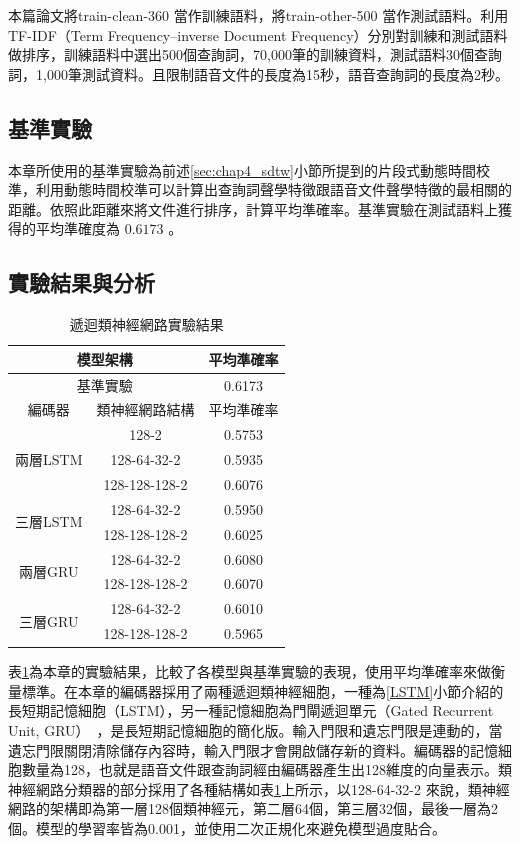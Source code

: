  本篇論文將train-clean-360 當作訓練語料，將train-other-500
 當作測試語料。利用TF-IDF（Term Frequency–inverse Document
 Frequency）分別對訓練和測試語料做排序，訓練語料中選出500個查詢詞，70,000筆的訓練資料，測試語料30個查詢詞，1,000筆測試資料。且限制語音文件的長度為15秒，語音查詢詞的長度為2秒。
\subsection{基準實驗}
本章所使用的基準實驗為前述\ref{sec:chap4_sdtw}小節所提到的片段式動態時間校準，利用動態時間校準可以計算出查詢詞聲學特徵跟語音文件聲學特徵的最相關的距離。依照此距離來將文件進行排序，計算平均準確率。基準實驗在測試語料上獲得的平均準確度為 $ 0.6173 $ 。
\subsection{實驗結果與分析}
 \begin{table}[ht]
	 \centering
	 \caption{遞迴類神經網路實驗結果}

	 \label{table:ch3_exp}
	 \begin{tabular}{|c|c|c|}
		 \hline
		 \multicolumn{2}{|c|}{模型架構} & 平均準確率 \\
		 \hline
		 \multicolumn{2}{|c|}{基準實驗} & 0.6173 \\
		 \hline
		 \hline 
		 編碼器 & 類神經網路結構 & 平均準確率  \\
		 \hline
		 \multirow{3}{*}{兩層LSTM} & 128-2 & 0.5753\\
		 \cline{2-3}
		 & 128-64-32-2 & 0.5935 \\
		 \cline{2-3}
		 & 128-128-128-2 & 0.6076\\
		 \hline
		 \multirow{2}{*}{三層LSTM} & 128-64-32-2 & 0.5950 \\
		 \cline{2-3}
		 & 128-128-128-2 & 0.6025 \\
		 \hline
		 \multirow{2}{*}{兩層GRU} & 128-64-32-2  &  0.6080\\
		 \cline{2-3}
		 & 128-128-128-2 & 0.6070 \\
		 \hline
		 \multirow{2}{*}{三層GRU} & 128-64-32-2  & 0.6010 \\
		 \cline{2-3}
		 & 128-128-128-2 & 0.5965 \\
		 \hline
	   \end{tabular}
 \end{table}

表\ref{table:ch3_exp}為本章的實驗結果，比較了各模型與基準實驗的表現，使用平均準確率來做衡量標準。在本章的編碼器採用了兩種遞迴類神經細胞，一種為\ref{LSTM}小節介紹的長短期記憶細胞（LSTM），另一種記憶細胞為門閘遞迴單元（Gated
Recurrent Unit,
GRU）~\cite{cho2014learning}，是長短期記憶細胞的簡化版。輸入門限和遺忘門限是連動的，當遺忘門限關閉清除儲存內容時，輸入門限才會開啟儲存新的資料。編碼器的記憶細胞數量為128，也就是語音文件跟查詢詞經由編碼器產生出128維度的向量表示。類神經網路分類器的部分採用了各種結構如表\ref{table:ch3_exp}上所示，以128-64-32-2
來說，類神經網路的架構即為第一層128個類神經元，第二層64個，第三層32個，最後一層為2個。模型的學習率皆為0.001，並使用二次正規化來避免模型過度貼合。

